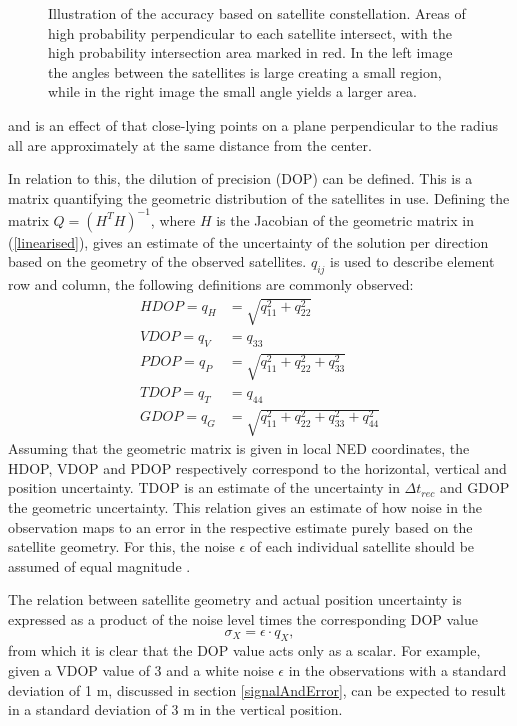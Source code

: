 \begin{figure}
\begin{minipage}[t]{0.38\textwidth}
\end{minipage}
\caption{\label{fig:DOPtheory} Illustration of the accuracy based on satellite constellation. Areas of high probability perpendicular to each satellite intersect, with the high probability intersection area marked in red. In the left image the angles between the satellites is large creating a small region, while in the right image the small angle yields a larger area.}
\end{figure}
and is an effect of that close-lying points on a plane perpendicular to the radius all are approximately at the same distance from the center. 
\par 
In relation to this, the dilution of precision (DOP) can be defined. This is a matrix quantifying the geometric distribution of the satellites in use. Defining the matrix $Q=(H^TH)^{-1}$, where $H$ is the Jacobian of the geometric matrix in (\ref{linearised}), gives an estimate of the uncertainty of the solution per direction based on the geometry of the observed satellites. $q_{ij}$ is used to describe element row and column, the following definitions are commonly observed:
\begin{align}
HDOP=q_H&=\sqrt{q_{11}^2+q_{22}^2}\label{eq:HDOP}\\ 
VDOP=q_V&=q_{33}\label{eq:VDOP}\\ 
PDOP=q_P&=\sqrt{q_{11}^2+q_{22}^2+q_{33}^2}\label{eq:PDOP}\\ 
TDOP=q_T&=q_{44}\label{eq:TDOP}\\ 
GDOP=q_G&=\sqrt{q_{11}^2+q_{22}^2+q_{33}^2+q_{44}^2} \label{eq:GDOP}
\end{align}
Assuming that the geometric matrix is given in local NED coordinates, the HDOP, VDOP and PDOP respectively correspond to the horizontal, vertical and position uncertainty. TDOP is an estimate of the uncertainty in $\Delta t_{rec}$ and GDOP the geometric uncertainty. This relation gives an estimate of how noise in the observation maps to an error in the respective estimate purely based on the satellite geometry. For this, the noise $\epsilon$ of each individual satellite should be assumed of equal magnitude \cite{tahsin2015analysis}. 
\par
The relation between satellite geometry and actual position uncertainty is expressed as a product of the noise level times the corresponding DOP value
\begin{equation}\label{UERE}
\sigma_X=\epsilon\cdot q_X,
\end{equation}
from which it is clear that the DOP value acts only as a scalar. For example, given a VDOP value of 3 and a white noise $\epsilon$ in the observations with a standard deviation of 1 m, discussed in section \ref{signalAndError}, can be expected to result in a standard deviation of 3 m in the vertical position.
